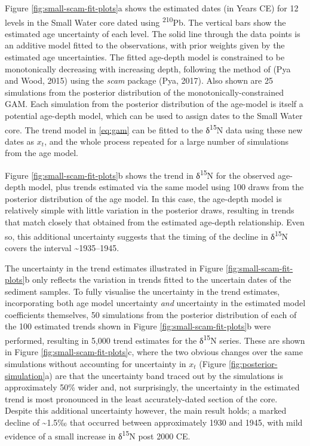 \documentclass[12pt,]{article}
\begin{document}
Figure \ref{fig:small-scam-fit-plots}a shows the estimated dates (in
Years CE) for 12 levels in the Small Water core dated using
\textsuperscript{210}Pb. The vertical bars show the estimated age
uncertainty of each level. The solid line through the data points is an
additive model fitted to the observations, with prior weights given by
the estimated age uncertainties. The fitted age-depth model is
constrained to be monotonically decreasing with increasing depth,
following the method of (Pya and Wood, 2015) using the \emph{scam}
package (Pya, 2017). Also shown are 25 simulations from the posterior
distribution of the monotonically-constrained GAM. Each simulation from
the posterior distribution of the age-model is itself a potential
age-depth model, which can be used to assign dates to the Small Water
core. The trend model in \eqref{eq:gam} can be fitted to the
δ\textsuperscript{15}N data using these new dates as \(x_t\), and the
whole process repeated for a large number of simulations from the age
model.

Figure \ref{fig:small-scam-fit-plots}b shows the trend in
δ\textsuperscript{15}N for the observed age-depth model, plus trends
estimated via the same model using 100 draws from the posterior
distribution of the age model. In this case, the age-depth model is
relatively simple with little variation in the posterior draws,
resulting in trends that match closely that obtained from the estimated
age-depth relationship. Even so, this additional uncertainty suggests
that the timing of the decline in δ\textsuperscript{15}N covers the
interval \textasciitilde{}1935--1945.

The uncertainty in the trend estimates illustrated in Figure
\ref{fig:small-scam-fit-plots}b only reflects the variation in trends
fitted to the uncertain dates of the sediment samples. To fully
visualise the uncertainty in the trend estimates, incorporating both age
model uncertainty \emph{and} uncertainty in the estimated model
coefficients themselves, 50 simulations from the posterior distribution
of each of the 100 estimated trends shown in Figure
\ref{fig:small-scam-fit-plots}b were performed, resulting in 5,000 trend
estimates for the δ\textsuperscript{15}N series. These are shown in
Figure \ref{fig:small-scam-fit-plots}c, where the two obvious changes
over the same simulations without accounting for uncertainty in \(x_t\)
(Figure \ref{fig:posterior-simulation}a) are that the uncertainty band
traced out by the simulations is approximately 50\% wider and, not
surprisingly, the uncertainty in the estimated trend is most pronounced
in the least accurately-dated section of the core. Despite this
additional uncertainty however, the main result holds; a marked decline
of \textasciitilde{}1.5‰ that occurred between approximately 1930 and
1945, with mild evidence of a small increase in δ\textsuperscript{15}N
post 2000 CE.
\end{document}
